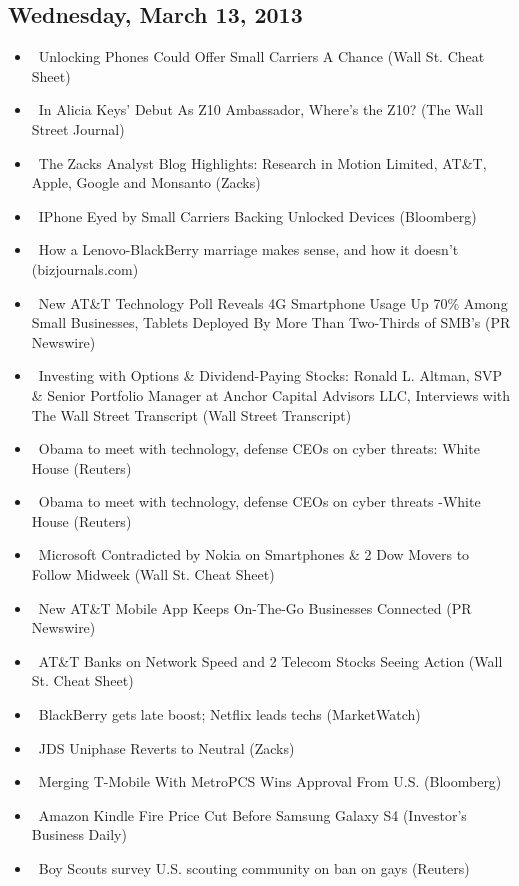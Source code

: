 \documentclass[11pt,asymmetric]{article}
\begin{document}
\subsection*{Wednesday, March 13, 2013}
\begin{itemize}
\item\ Unlocking Phones Could Offer Small Carriers A Chance (Wall St. Cheat Sheet)
\item\ In Alicia Keys' Debut As Z10 Ambassador, Where's the Z10? (The Wall Street Journal)
\item\ The Zacks Analyst Blog Highlights: Research in Motion Limited, AT\&T, Apple, Google and Monsanto (Zacks)
\item\ IPhone Eyed by Small Carriers Backing Unlocked Devices (Bloomberg)
\item\ How a Lenovo-BlackBerry marriage makes sense, and how it doesn’t (bizjournals.com)
\item\ New AT\&T Technology Poll Reveals 4G Smartphone Usage Up 70\% Among Small Businesses, Tablets Deployed By More Than Two-Thirds of SMB's (PR Newswire)
\item\ Investing with Options \& Dividend-Paying Stocks: Ronald L. Altman, SVP \& Senior Portfolio Manager at Anchor Capital Advisors LLC, Interviews with The Wall Street Transcript (Wall Street Transcript)
\item\ Obama to meet with technology, defense CEOs on cyber threats: White House (Reuters)
\item\ Obama to meet with technology, defense CEOs on cyber threats -White House (Reuters)
\item\ Microsoft Contradicted by Nokia on Smartphones \& 2 Dow Movers to Follow Midweek (Wall St. Cheat Sheet)
\item\ New AT\&T Mobile App Keeps On-The-Go Businesses Connected (PR Newswire)
\item\ AT\&T Banks on Network Speed and 2 Telecom Stocks Seeing Action (Wall St. Cheat Sheet)
\item\ BlackBerry gets late boost; Netflix leads techs (MarketWatch)
\item\ JDS Uniphase Reverts to Neutral (Zacks)
\item\ Merging T-Mobile With MetroPCS Wins Approval From U.S. (Bloomberg)
\item\ Amazon Kindle Fire Price Cut Before Samsung Galaxy S4 (Investor's Business Daily)
\item\ Boy Scouts survey U.S. scouting community on ban on gays (Reuters)
\end{itemize}
\end{document}
